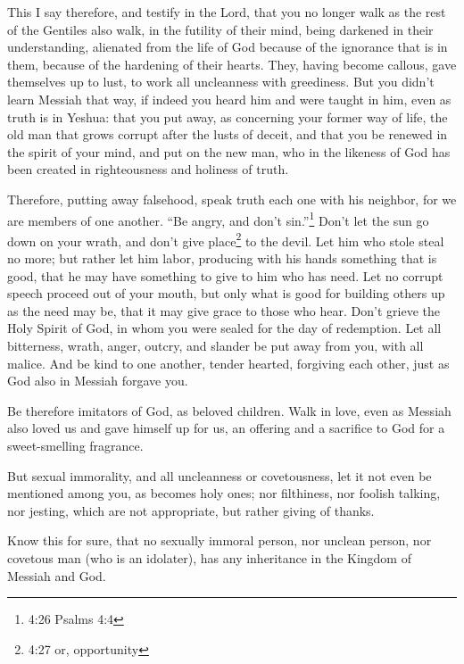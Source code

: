 \myverse{}This I say therefore, and testify in the Lord, that you no longer
walk as the rest of the Gentiles also walk, in the futility of their mind,
\myverse{}being darkened in their understanding, alienated from the life of God because
of the ignorance that is in them, because of the hardening of their hearts.
\myverse{}They, having become callous, gave themselves up to lust, to work all uncleanness
with greediness.
\myverse{}But you didn’t learn Messiah that way,
\myverse{}if indeed you heard him and were taught in him, even as truth is in Yeshua:
\myverse{}that you put away, as concerning your former way of life, the old man that
grows corrupt after the lusts of deceit,
\myverse{}and that you be renewed in the spirit of your mind,
\myverse{}and put on the new man, who in the likeness of God has been created in righteousness
and holiness of truth.

\myverse{}Therefore, putting away falsehood, speak truth each one with
his neighbor, for we are members of one another.
\myverse{}“Be angry, and don’t sin.”\footnote{4:26 Psalms 4:4} Don’t let the sun go down on your wrath,
\myverse{}and don’t give place\footnote{4:27 or, opportunity} to the devil.
\myverse{}Let him who stole steal no more; but rather let him labor, producing with
his hands something that is good, that he may have something to give to him who has need.
\myverse{}Let no corrupt speech proceed out of your mouth, but only what is good for
building others up as the need may be, that it may give grace to those who hear.
\myverse{}Don’t grieve the Holy Spirit of God, in whom you were sealed for the day of
redemption.
\myverse{}Let all bitterness, wrath, anger, outcry, and slander be put away from you,
with all malice.
\myverse{}And be kind to one another, tender hearted, forgiving each other, just as
God also in Messiah forgave you.


\mychapter{} \myverse*{}Be therefore imitators of God, as beloved children.
\myverse{}Walk in love, even as Messiah also loved us and gave himself up for us, an offering
and a sacrifice to God for a sweet-smelling fragrance.

\myverse{}But sexual immorality, and all uncleanness or covetousness, let
it not even be mentioned among you, as becomes holy ones;
\myverse{}nor filthiness, nor foolish talking, nor jesting, which are not appropriate,
but rather giving of thanks.

\myverse{}Know this for sure, that no sexually immoral person, nor unclean
person, nor covetous man (who is an idolater), has any inheritance in the Kingdom of Messiah and God.

